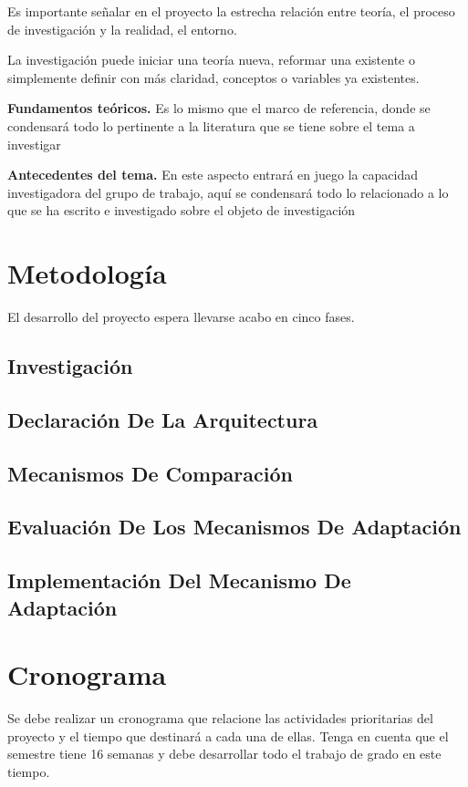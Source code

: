 \documentclass[12pt]{article}
\begin{document}
    Es importante señalar en el proyecto la estrecha relación entre teoría, el proceso de investigación y la realidad, el entorno. 

    La investigación puede iniciar una teoría nueva, reformar una existente o simplemente definir con más claridad, conceptos o variables ya existentes.

    \textbf{Fundamentos teóricos.} Es lo mismo que el marco de referencia, donde se condensará todo lo pertinente a la literatura que se tiene sobre el tema a investigar
    
    \textbf{Antecedentes del tema.}  En este aspecto entrará en juego la capacidad investigadora del grupo de trabajo, aquí se condensará todo lo relacionado a lo que se ha escrito e investigado sobre el objeto de investigación

    \section{Metodología}

    El desarrollo del proyecto espera llevarse acabo en cinco fases.

    \subsection{Investigación}


    \subsection{Declaración De La Arquitectura}
    

    \subsection{Mecanismos De Comparación}
    \subsection{Evaluación De Los Mecanismos De Adaptación}
    \subsection{Implementación Del Mecanismo De Adaptación}


    \section{Cronograma}

    Se debe realizar un cronograma que relacione las actividades prioritarias del proyecto y el tiempo que destinará a cada una de ellas. Tenga en cuenta que el semestre tiene 16 semanas y debe desarrollar todo el trabajo de grado en este tiempo. 
\end{document}
